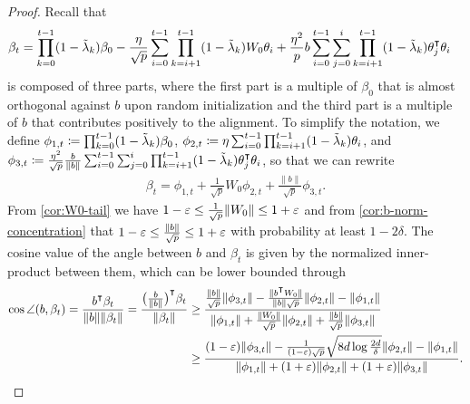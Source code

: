 \begin{proof}
    Recall that
    \begin{align*}
        \beta_t &= \prod_{k=0}^{t-1}(1-\tlam_k)\beta_0 - \frac{\eta}{\sqrt p}\sum_{i=0}^{t-1} \prod_{k=i+1}^{t-1}(1-\tlam_k)W_0\theta_i + \frac{\eta^2}{p}b\sum_{i=0}^{t-1}\sum_{j=0}^i\prod_{k=i+1}^{t-1}(1-\tlam_k)\theta_j\transpose\theta_i
    \end{align*}
    is composed of three parts, where the first part is a multiple of $\beta_0$ that is almost orthogonal against $b$ upon random initialization and the third part is a multiple of $b$ that contributes positively to the alignment. To simplify the notation, we define $\phi_{1,t} \coloneqq \prod_{k=0}^{t-1}(1-\tilde{\lambda}_k)\beta_0$, $\phi_{2,t} \coloneqq \eta\sum_{i=0}^{t-1} \prod_{k=i+1}^{t-1} (1-\tilde{\lambda}_k)\theta_i$, and $\phi_{3,t} \defeq \frac{\eta^2}{\sqrt p} \frac{b}{\|b\|} \sum_{i=0}^{t-1} \sum_{j=0}^i \prod_{k=i+1}^{t-1}(1-\tlam_k) \theta_j\transpose\theta_i$, so that we can rewrite 
    \begin{align*}
        \beta_t = \phi_{1,t} + \frac{1}{\sqrt p}W_0 \phi_{2,t} + \frac{\|b\|}{\sqrt p}\phi_{3,t}.
    \end{align*}
    From \cref{cor:W0-tail} we have $1-\varepsilon\leq \frac{1}{\sqrt p} \|W_0\| \leq 1+\varepsilon$ and from \cref{cor:b-norm-concentration} that $1-\varepsilon \leq \frac{\|b\|}{\sqrt p} \leq 1+\varepsilon$ with probability at least $1-2\delta$. The cosine value of the angle between $b$ and $\beta_t$ is given by the normalized inner-product between them, which can be lower bounded through
    \begin{align*}
        \cos\angle(b, \beta_t) 
        = \frac{b\transpose \beta_t}{\|b\|\|\beta_t\|}  = \frac{\big(\frac{b}{\|b\|}\big)\transpose \beta_t}{\|\beta_t\|} & \geq \frac{\frac{\|b\|}{\sqrt p}\|\phi_{3,t}\|-\frac{\|b\transpose W_0\|}{\|b\|\sqrt p}\|\phi_{2,t}\| - \|\phi_{1,t}\|}{\|\phi_{1,t}\|+\frac{\|W_0\|}{\sqrt p}\|\phi_{2,t}\|+\frac{\|b\|}{\sqrt p}\|\phi_{3,t}\|} \\
        & \geq \frac{(1-\eps)\|\phi_{3,t}\|-\frac{1}{(1-\eps)\sqrt{p}} \sqrt{8d\log\frac{2d}{\delta}} \|\phi_{2,t}\| - \|\phi_{1,t}\|}{\|\phi_{1,t}\|+(1+\eps)\|\phi_{2,t}\|+(1+\eps)\|\phi_{3,t}\|}.
    \end{align*}


\end{proof}

